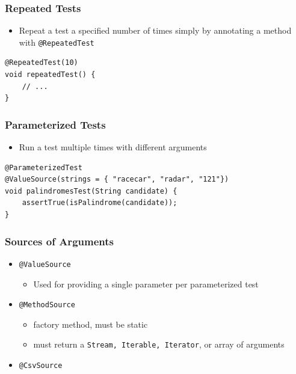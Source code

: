 \documentclass{beamer}
\begin{document}
\begin{frame}[fragile]
\frametitle{Repeated Tests}

\begin{itemize}
\item Repeat a test a specified number of times simply by annotating a method with \texttt{@RepeatedTest}

\end {itemize}

\begin{example}
 \begin{lstlisting}
@RepeatedTest(10)
void repeatedTest() {
    // ...
}
\end{lstlisting}
\end{example}

\end{frame}


\begin{frame}[fragile]
\frametitle{Parameterized Tests}

\begin{itemize}
\item Run a test multiple times with different arguments

\end {itemize}

\begin{example}
 \begin{lstlisting}
@ParameterizedTest
@ValueSource(strings = { "racecar", "radar", "121"})
void palindromesTest(String candidate) {
    assertTrue(isPalindrome(candidate));
}
\end{lstlisting}
\end{example}

\end{frame}



\begin{frame}[fragile]
\frametitle{Sources of Arguments}

\begin{itemize}
\item \texttt{@ValueSource}
    \begin{itemize}
    \item Used for providing a single parameter per parameterized test
    \end{itemize}
\item \texttt{@MethodSource}
    \begin{itemize}
            \item factory method, must be static 
            \item must return a \texttt{Stream, Iterable, Iterator}, or array of arguments
    \end{itemize}
\item \texttt{@CsvSource}

\end {itemize}

\end{frame}
\end{document}
